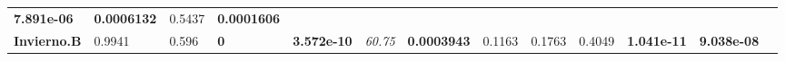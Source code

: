 \documentclass[]{book}
\theoremstyle{definition}
\theoremstyle{definition}
\theoremstyle{definition}
\theoremstyle{remark}
\begin{document}
\begin{longtable}[]{@{}lllllllllllll@{}}
\begin{minipage}[t]{0.05\columnwidth}
\textbf{7.891e-06}\strut
\end{minipage} & \begin{minipage}[t]{0.05\columnwidth}\raggedright
\textbf{0.0006132}\strut
\end{minipage} & \begin{minipage}[t]{0.06\columnwidth}\raggedright
0.5437\strut
\end{minipage} & \begin{minipage}[t]{0.05\columnwidth}\raggedright
\textbf{0.0001606}\strut
\end{minipage}\tabularnewline
\begin{minipage}[t]{0.06\columnwidth}\raggedright
\textbf{Invierno.B}\strut
\end{minipage} & \begin{minipage}[t]{0.05\columnwidth}\raggedright
0.9941\strut
\end{minipage} & \begin{minipage}[t]{0.05\columnwidth}\raggedright
0.596\strut
\end{minipage} & \begin{minipage}[t]{0.06\columnwidth}\raggedright
\textbf{0}\strut
\end{minipage} & \begin{minipage}[t]{0.05\columnwidth}\raggedright
\textbf{3.572e-10}\strut
\end{minipage} & \begin{minipage}[t]{0.05\columnwidth}\raggedright
\emph{60.75}\strut
\end{minipage} & \begin{minipage}[t]{0.05\columnwidth}\raggedright
\textbf{0.0003943}\strut
\end{minipage} & \begin{minipage}[t]{0.06\columnwidth}\raggedright
0.1163\strut
\end{minipage} & \begin{minipage}[t]{0.05\columnwidth}\raggedright
0.1763\strut
\end{minipage} & \begin{minipage}[t]{0.05\columnwidth}\raggedright
0.4049\strut
\end{minipage} & \begin{minipage}[t]{0.05\columnwidth}\raggedright
\textbf{1.041e-11}\strut
\end{minipage} & \begin{minipage}[t]{0.06\columnwidth}\raggedright
\textbf{9.038e-08}\strut
\end{minipage} & \begin{minipage}[t]{0.05\columnwidth}\raggedright

\end{minipage}
\end{longtable}
\end{document}
